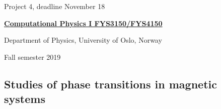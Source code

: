 \documentclass[%
oneside,                 %
final,                   %
10pt]{article}
\begin{document}

\newcommand{\exercisesection}[1]{\subsection*{#1}}






\thispagestyle{empty}

\begin{center}
{\LARGE\bf
\begin{spacing}{1.25}
Project 4, deadline  November 18
\end{spacing}
}
\end{center}


\begin{center}
{\bf \href{{http://www.uio.no/studier/emner/matnat/fys/FYS3150/index-eng.html}}{Computational Physics I FYS3150/FYS4150}}
\end{center}

    \begin{center}
\centerline{{\small Department of Physics, University of Oslo, Norway}}
\end{center}
    

\begin{center}
Fall semester 2019
\end{center}

\vspace{1cm}


\subsection*{Studies of phase transitions in magnetic systems}
\end{document}
